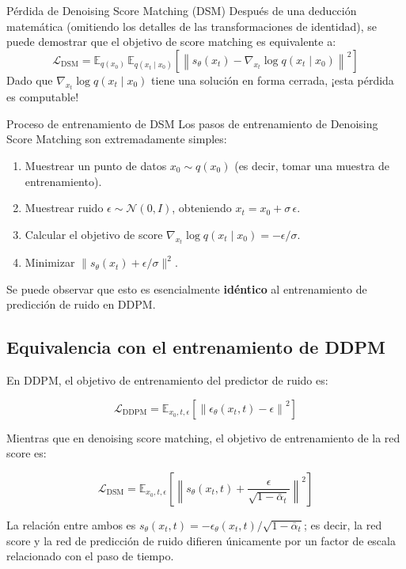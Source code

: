 \begin{importantbox}{Pérdida de Denoising Score Matching (DSM)}
Después de una deducción matemática (omitiendo los detalles de las transformaciones de identidad), se puede demostrar que el objetivo de score matching es equivalente a:
$$\mathcal{L}_{\text{DSM}} = \mathbb{E}_{q(x_0)}\, \mathbb{E}_{q(x_t \mid x_0)}\left[\left\| s_\theta(x_t) - \nabla_{x_t} \log q(x_t \mid x_0) \right\|^2\right]$$
Dado que $\nabla_{x_t} \log q(x_t \mid x_0)$ tiene una solución en forma cerrada, ¡esta pérdida es computable!
\end{importantbox}

\begin{knowledgebox}{Proceso de entrenamiento de DSM}
Los pasos de entrenamiento de Denoising Score Matching son extremadamente simples:
\begin{enumerate}
    \item Muestrear un punto de datos $x_0 \sim q(x_0)$ (es decir, tomar una muestra de entrenamiento).
    \item Muestrear ruido $\epsilon \sim \mathcal{N}(0, I)$, obteniendo $x_t = x_0 + \sigma\, \epsilon$.
    \item Calcular el objetivo de score $\nabla_{x_t} \log q(x_t \mid x_0) = -\epsilon / \sigma$.
    \item Minimizar $\|s_\theta(x_t) + \epsilon/\sigma\|^2$.
\end{enumerate}
Se puede observar que esto es esencialmente \textbf{idéntico} al entrenamiento de predicción de ruido en DDPM.
\end{knowledgebox}

\subsection{Equivalencia con el entrenamiento de DDPM}

En DDPM, el objetivo de entrenamiento del predictor de ruido es:

$$\mathcal{L}_{\text{DDPM}} = \mathbb{E}_{x_0, t, \epsilon}\left[\left\| \epsilon_\theta(x_t, t) - \epsilon \right\|^2\right]$$

Mientras que en denoising score matching, el objetivo de entrenamiento de la red score es:

$$\mathcal{L}_{\text{DSM}} = \mathbb{E}_{x_0, t, \epsilon}\left[\left\| s_\theta(x_t, t) + \frac{\epsilon}{\sqrt{1-\bar{\alpha}_t}} \right\|^2\right]$$

La relación entre ambos es $s_\theta(x_t, t) = -\epsilon_\theta(x_t, t) / \sqrt{1-\bar{\alpha}_t}$; es decir, la red score y la red de predicción de ruido difieren únicamente por un factor de escala relacionado con el paso de tiempo.

